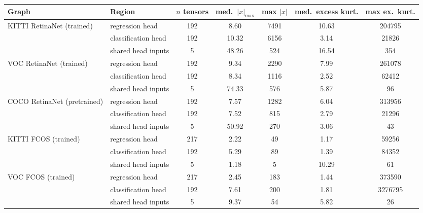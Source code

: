 \begin{tabular}{llccccc}
\toprule
Graph & Region & $n$ tensors & med.~$|x|_{\max}$ & max $|x|$ & med.~excess kurt. & max ex.~kurt. \\
\midrule
KITTI RetinaNet (trained) & regression head & 192 & 8.60 & 7491 & 10.63 & 204795 \\
 & classification head & 192 & 10.32 & 6156 & 3.14 & 21826 \\
 & shared head inputs & 5 & 48.26 & 524 & 16.54 & 354 \\
\addlinespace[3pt]
VOC RetinaNet (trained) & regression head & 192 & 9.34 & 2290 & 7.99 & 261078 \\
 & classification head & 192 & 8.34 & 1116 & 2.52 & 62412 \\
 & shared head inputs & 5 & 74.33 & 576 & 5.87 & 96 \\
\addlinespace[3pt]
COCO RetinaNet (pretrained) & regression head & 192 & 7.57 & 1282 & 6.04 & 313956 \\
 & classification head & 192 & 7.52 & 815 & 2.79 & 21296 \\
 & shared head inputs & 5 & 50.92 & 270 & 3.06 & 43 \\
\addlinespace[3pt]
KITTI FCOS (trained) & regression head & 217 & 2.22 & 49 & 1.17 & 59256 \\
 & classification head & 192 & 5.29 & 89 & 1.39 & 84352 \\
 & shared head inputs & 5 & 1.18 & 5 & 10.29 & 61 \\
\addlinespace[3pt]
VOC FCOS (trained) & regression head & 217 & 2.45 & 183 & 1.44 & 373590 \\
 & classification head & 192 & 7.61 & 200 & 1.81 & 3276795 \\
 & shared head inputs & 5 & 9.37 & 54 & 5.82 & 26 \\
\bottomrule
\end{tabular}
